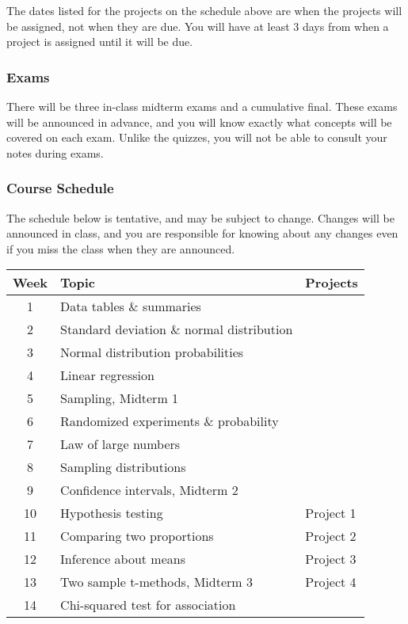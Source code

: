 \documentclass[10pt]{article}
\begin{document}
The dates listed for the projects on the schedule above are when the projects will be assigned, not when they are due. You will have at least 3 days from when a project is assigned until it will be due.

\subsubsection*{Exams}

There will be three in-class midterm exams and a cumulative final. These exams will be announced in advance, and you will know exactly what concepts will be covered on each exam.  Unlike the quizzes, you will not be able to consult your notes during exams. 

\subsubsection*{Course Schedule} 

The schedule below is tentative, and may be subject to change. Changes will be announced in class, and you are responsible for knowing about any changes even if you miss the class when they are announced. 

\begin{center}
\begin{tabular}{|c|l|l|}
\hline
Week  & Topic & Projects \\ \hline
1  & Data tables \& summaries  &  \\
2  & Standard deviation \& normal distribution  &  \\
3  & Normal distribution probabilities  &  \\
4  & Linear regression  &  \\
5  & Sampling, Midterm 1  &  \\
6  & Randomized experiments \& probability  &  \\
7  & Law of large numbers  &  \\
8  & Sampling distributions  &  \\
9  & Confidence intervals, Midterm 2  &  \\
10  & Hypothesis testing  & Project 1 \\
11  & Comparing two proportions  & Project 2 \\
12  & Inference about means  & Project 3 \\
13  & Two sample t-methods, Midterm 3  & Project 4 \\
14  & Chi-squared test for association  &  \\ \hline
\end{tabular}
\end{center}
\end{document}
